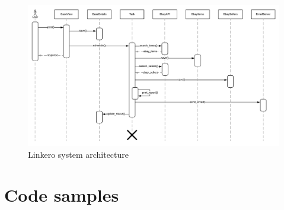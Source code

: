 \begin{figure}[h!]
\centering
\includegraphics[angle=90, scale=0.7]{imgs/SequenceDiagram.pdf}
\caption{Linkero system architecture}
\label{fig:sysarch}
\end{figure}

\section{Code samples}
